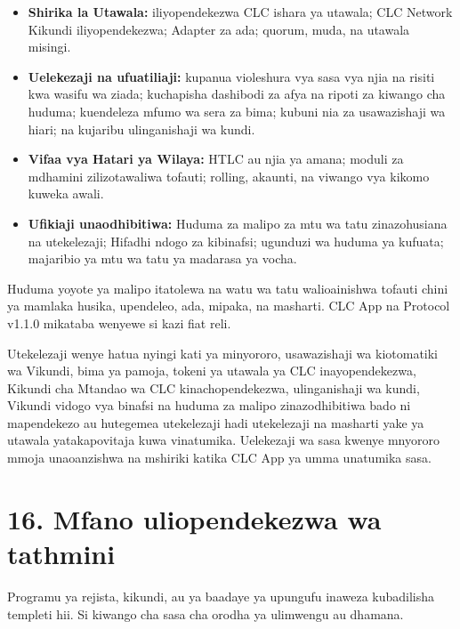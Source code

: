 \documentclass[11pt]{article}
\begin{document}
\begin{itemize}[leftmargin=*]
\item \textbf{Shirika la Utawala:} iliyopendekezwa CLC ishara ya utawala; CLC Network Kikundi iliyopendekezwa; Adapter za ada; quorum, muda, na utawala misingi.
\item \textbf{Uelekezaji na ufuatiliaji:} kupanua violeshura vya sasa vya njia na risiti kwa wasifu wa ziada; kuchapisha dashibodi za afya na ripoti za kiwango cha huduma; kuendeleza mfumo wa sera za bima; kubuni nia za usawazishaji wa hiari; na kujaribu ulinganishaji wa kundi.
\item \textbf{Vifaa vya Hatari ya Wilaya:} HTLC au njia ya amana; moduli za mdhamini zilizotawaliwa tofauti; rolling, akaunti, na viwango vya kikomo kuweka awali.
\item \textbf{Ufikiaji unaodhibitiwa:} Huduma za malipo za mtu wa tatu zinazohusiana na utekelezaji; Hifadhi ndogo za kibinafsi; ugunduzi wa huduma ya kufuata; majaribio ya mtu wa tatu ya madarasa ya vocha.
\end{itemize}
Huduma yoyote ya malipo itatolewa na watu wa tatu walioainishwa tofauti chini ya mamlaka husika, upendeleo, ada, mipaka, na masharti. CLC App na Protocol v1.1.0 mikataba wenyewe si kazi fiat reli.

Utekelezaji wenye hatua nyingi kati ya minyororo, usawazishaji wa kiotomatiki wa Vikundi, bima ya pamoja, tokeni ya utawala ya CLC inayopendekezwa, Kikundi cha Mtandao wa CLC kinachopendekezwa, ulinganishaji wa kundi, Vikundi vidogo vya binafsi na huduma za malipo zinazodhibitiwa bado ni mapendekezo au hutegemea utekelezaji hadi utekelezaji na masharti yake ya utawala yatakapovitaja kuwa vinatumika. Uelekezaji wa sasa kwenye mnyororo mmoja unaoanzishwa na mshiriki katika CLC App ya umma unatumika sasa.


\section*{16. Mfano uliopendekezwa wa tathmini}

Programu ya rejista, kikundi, au ya baadaye ya upungufu inaweza kubadilisha templeti hii. Si kiwango cha sasa cha orodha ya ulimwengu au dhamana.
\end{document}
